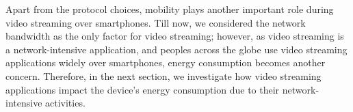 Apart from the protocol choices, mobility plays another important role during video streaming over smartphones. Till now, we considered the network bandwidth as the only factor for video streaming; however, as video streaming is a network-intensive application, and peoples across the globe use video streaming applications widely over smartphones, energy consumption becomes another concern. Therefore, in the next section, we investigate how video streaming applications impact the device's energy consumption due to their network-intensive activities.  




